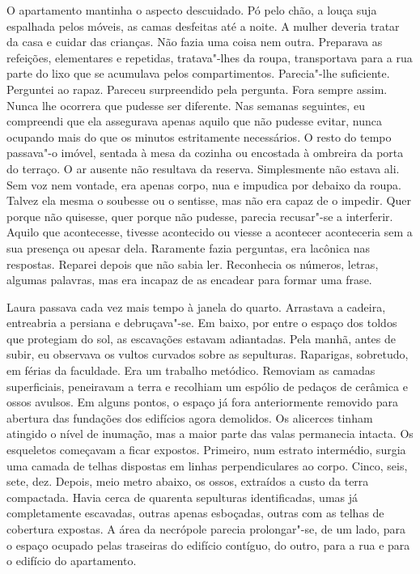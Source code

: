 O apartamento mantinha o aspecto descuidado. Pó pelo chão, a louça suja
espalhada pelos móveis, as camas desfeitas até a noite. A mulher deveria
tratar da casa e cuidar das crianças. Não fazia uma coisa nem outra.
Preparava as refeições, elementares e repetidas, tratava"-lhes da roupa,
transportava para a rua parte do lixo que se acumulava pelos
compartimentos. Parecia"-lhe suficiente. Perguntei ao rapaz. Pareceu
surpreendido pela pergunta. Fora sempre assim. Nunca lhe ocorrera que
pudesse ser diferente. Nas semanas seguintes, eu compreendi que ela
assegurava apenas aquilo que não pudesse evitar, nunca ocupando mais do
que os minutos estritamente necessários. O resto do tempo passava"-o
imóvel, sentada à mesa da cozinha ou encostada à ombreira da porta do
terraço. O ar ausente não resultava da reserva. Simplesmente não estava
ali. Sem voz nem vontade, era apenas corpo, nua e impudica por debaixo
da roupa. Talvez ela mesma o soubesse ou o sentisse, mas não era capaz
de o impedir. Quer porque não quisesse, quer porque não pudesse, parecia
recusar"-se a interferir. Aquilo que acontecesse, tivesse acontecido ou
viesse a acontecer aconteceria sem a sua presença ou apesar dela.
Raramente fazia perguntas, era lacônica nas respostas. Reparei depois
que não sabia ler. Reconhecia os números, letras, algumas palavras, mas
era incapaz de as encadear para formar uma frase.

Laura passava cada vez mais tempo à janela do quarto. Arrastava a
cadeira, entreabria a persiana e debruçava"-se. Em baixo, por entre o
espaço dos toldos que protegiam do sol, as escavações estavam
adiantadas. Pela manhã, antes de subir, eu observava os vultos curvados
sobre as sepulturas. Raparigas, sobretudo, em férias da faculdade. Era
um trabalho metódico. Removiam as camadas superficiais, peneiravam a
terra e recolhiam um espólio de pedaços de cerâmica e ossos avulsos. Em
alguns pontos, o espaço já fora anteriormente removido para abertura das
fundações dos edifícios agora demolidos. Os alicerces tinham atingido o
nível de inumação, mas a maior parte das valas permanecia intacta. Os
esqueletos começavam a ficar expostos. Primeiro, num estrato intermédio,
surgia uma camada de telhas dispostas em linhas perpendiculares ao
corpo. Cinco, seis, sete, dez. Depois, meio metro abaixo, os ossos,
extraídos a custo da terra compactada. Havia cerca de quarenta
sepulturas identificadas, umas já completamente escavadas, outras apenas
esboçadas, outras com as telhas de cobertura expostas. A área da
necrópole parecia prolongar"-se, de um lado, para o espaço ocupado pelas
traseiras do edifício contíguo, do outro, para a rua e para o edifício
do apartamento.

